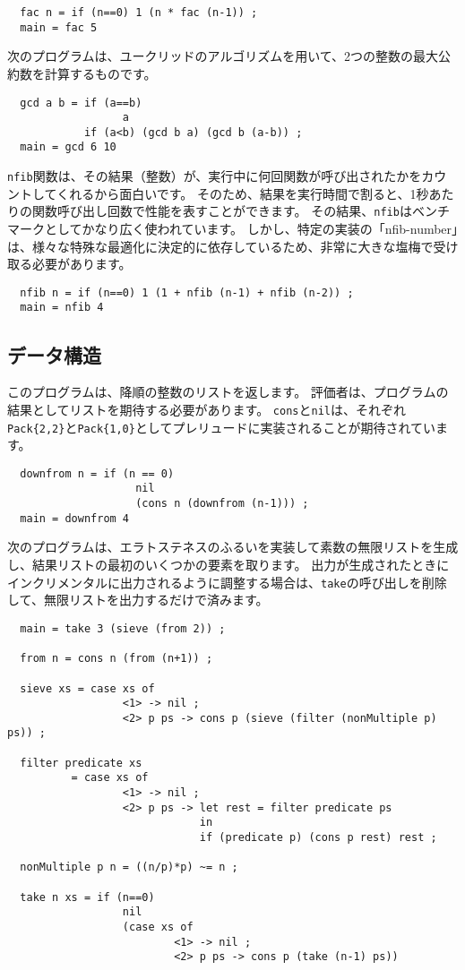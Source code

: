\documentclass{jarticle}
\begin{document}
\begin{verbatim}
  fac n = if (n==0) 1 (n * fac (n-1)) ;
  main = fac 5
\end{verbatim}

次のプログラムは、ユークリッドのアルゴリズムを用いて、2つの整数の最大公約数を計算するものです。

\begin{verbatim}
  gcd a b = if (a==b)
                  a
            if (a<b) (gcd b a) (gcd b (a-b)) ;
  main = gcd 6 10
\end{verbatim}

\texttt{nfib}関数は、その結果（整数）が、実行中に何回関数が呼び出されたかをカウントしてくれるから面白いです。
そのため、結果を実行時間で割ると、1秒あたりの関数呼び出し回数で性能を表すことができます。
その結果、\texttt{nfib}はベンチマークとしてかなり広く使われています。
しかし、特定の実装の「nfib-number」は、様々な特殊な最適化に決定的に依存しているため、非常に大きな塩梅で受け取る必要があります。

\begin{verbatim}
  nfib n = if (n==0) 1 (1 + nfib (n-1) + nfib (n-2)) ;
  main = nfib 4
\end{verbatim}

\subsection{データ構造}

このプログラムは、降順の整数のリストを返します。
評価者は、プログラムの結果としてリストを期待する必要があります。
\texttt{cons}と\texttt{nil}は、それぞれ\texttt{Pack\{2,2\}}と\texttt{Pack\{1,0\}}としてプレリュードに実装されることが期待されています。

\begin{verbatim}
  downfrom n = if (n == 0)
                    nil
                    (cons n (downfrom (n-1))) ;
  main = downfrom 4
\end{verbatim}

次のプログラムは、エラトステネスのふるいを実装して素数の無限リストを生成し、結果リストの最初のいくつかの要素を取ります。
出力が生成されたときにインクリメンタルに出力されるように調整する場合は、\texttt{take}の呼び出しを削除して、無限リストを出力するだけで済みます。

\begin{verbatim}
  main = take 3 (sieve (from 2)) ;

  from n = cons n (from (n+1)) ;

  sieve xs = case xs of
                  <1> -> nil ;
                  <2> p ps -> cons p (sieve (filter (nonMultiple p) ps)) ;

  filter predicate xs
          = case xs of
                  <1> -> nil ;
                  <2> p ps -> let rest = filter predicate ps
                              in
                              if (predicate p) (cons p rest) rest ;

  nonMultiple p n = ((n/p)*p) ~= n ;

  take n xs = if (n==0)
                  nil
                  (case xs of
                          <1> -> nil ;
                          <2> p ps -> cons p (take (n-1) ps))
\end{verbatim}
\end{document}
